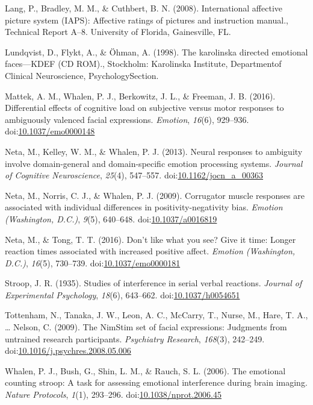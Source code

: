 \documentclass[man]{apa6}
\begin{document}
\leavevmode\hypertarget{ref-lang_international_2008}{}%
Lang, P., Bradley, M. M., \& Cuthbert, B. N. (2008). International affective picture system (IAPS): Affective ratings of pictures and instruction manual., Technical Report A--8. University of Florida, Gainesville, FL.

\leavevmode\hypertarget{ref-lundqvist_karolinska_1998}{}%
Lundqvist, D., Flykt, A., \& Öhman, A. (1998). The karolinska directed emotional faces---KDEF (CD ROM)., Stockholm: Karolinska Institute, Departmentof Clinical Neuroscience, PsychologySection.

\leavevmode\hypertarget{ref-mattek_differential_2016}{}%
Mattek, A. M., Whalen, P. J., Berkowitz, J. L., \& Freeman, J. B. (2016). Differential effects of cognitive load on subjective versus motor responses to ambiguously valenced facial expressions. \emph{Emotion}, \emph{16}(6), 929--936. doi:\href{https://doi.org/10.1037/emo0000148}{10.1037/emo0000148}

\leavevmode\hypertarget{ref-neta_neural_2013}{}%
Neta, M., Kelley, W. M., \& Whalen, P. J. (2013). Neural responses to ambiguity involve domain-general and domain-specific emotion processing systems. \emph{Journal of Cognitive Neuroscience}, \emph{25}(4), 547--557. doi:\href{https://doi.org/10.1162/jocn_a_00363}{10.1162/jocn\_a\_00363}

\leavevmode\hypertarget{ref-neta_corrugator_2009}{}%
Neta, M., Norris, C. J., \& Whalen, P. J. (2009). Corrugator muscle responses are associated with individual differences in positivity-negativity bias. \emph{Emotion (Washington, D.C.)}, \emph{9}(5), 640--648. doi:\href{https://doi.org/10.1037/a0016819}{10.1037/a0016819}

\leavevmode\hypertarget{ref-neta_dont_2016}{}%
Neta, M., \& Tong, T. T. (2016). Don't like what you see? Give it time: Longer reaction times associated with increased positive affect. \emph{Emotion (Washington, D.C.)}, \emph{16}(5), 730--739. doi:\href{https://doi.org/10.1037/emo0000181}{10.1037/emo0000181}

\leavevmode\hypertarget{ref-stroop_studies_1935}{}%
Stroop, J. R. (1935). Studies of interference in serial verbal reactions. \emph{Journal of Experimental Psychology}, \emph{18}(6), 643--662. doi:\href{https://doi.org/10.1037/h0054651}{10.1037/h0054651}

\leavevmode\hypertarget{ref-tottenham_nimstim_2009}{}%
Tottenham, N., Tanaka, J. W., Leon, A. C., McCarry, T., Nurse, M., Hare, T. A., \ldots{} Nelson, C. (2009). The NimStim set of facial expressions: Judgments from untrained research participants. \emph{Psychiatry Research}, \emph{168}(3), 242--249. doi:\href{https://doi.org/10.1016/j.psychres.2008.05.006}{10.1016/j.psychres.2008.05.006}

\leavevmode\hypertarget{ref-whalen_emotional_2006}{}%
Whalen, P. J., Bush, G., Shin, L. M., \& Rauch, S. L. (2006). The emotional counting stroop: A task for assessing emotional interference during brain imaging. \emph{Nature Protocols}, \emph{1}(1), 293--296. doi:\href{https://doi.org/10.1038/nprot.2006.45}{10.1038/nprot.2006.45}

\endgroup
\end{document}
